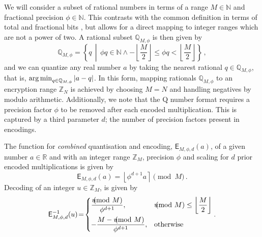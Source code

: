 \documentclass[10pt,letterpaper,oneside,twocolumn,journal]{IEEEtran}
\theoremstyle{definition}
\theoremstyle{definition}
\theoremstyle{remark}
\begin{document}
We will consider a subset of rational numbers in terms of a range $M \in \mathbb{N}$ and fractional precision $\phi \in \mathbb{N}$. This contrasts with the common definition in terms of total and fractional bits \cite{oberstarFixedPointRepresentationFractional2007,schulzedarupEncryptedCooperativeControl2019,farokhiSecurePrivateControl2017}, but allows for a direct mapping to integer ranges which are not a power of two. A rational subset $\mathbb{Q}_{M,\phi}$ is then given by
\begin{equation}
    \mathbb{Q}_{M,\phi} = \left\{q \,\middle|\, \phi q \in \mathbb{N} \wedge -\left\lfloor\frac{M}{2}\right\rfloor \leq \phi q < \left\lfloor\frac{M}{2}\right\rfloor \right\}\,,
\end{equation}
and we can quantize any real number $a$ by taking the nearest rational $q \in \mathbb{Q}_{M,\phi}$, that is, $\operatorname*{arg\,min}_{q\in\mathbb{Q}_{M,\phi}} |a-q|$. In this form, mapping rationals $\mathbb{Q}_{M,\phi}$ to an encryption range $\mathbb{Z}_N$ is achieved by choosing $M=N$ and handling negatives by modulo arithmetic. Additionally, we note that the Q number format requires a precision factor $\phi$ to be removed after each encoded multiplication. This is captured by a third parameter $d$; the number of precision factors present in encodings.

The function for \textit{combined} quantisation and encoding, $\mathsf{E}_{M,\phi,d}(a)$, of a given number $a \in \mathbb{R}$ and with an integer range $\mathbb{Z}_M$, precision $\phi$ and scaling for $d$ prior encoded multiplications is given by
\begin{equation}
    \mathsf{E}_{M,\phi,d}(a) = \left\lfloor \phi^{d+1} a \right\rceil \pmod{M}\,. \label{eqn:encode}
\end{equation}
Decoding of an integer $u \in \mathbb{Z}_M$, is given by
\begin{equation}
    \mathsf{E}^{-1}_{M,\phi,d}(u) \!=\! 
    \begin{dcases}
        \frac{u\hspace{-8pt}\pmod{M}}{\phi^{d+1}}, &u\hspace{-8pt}\pmod{M} \leq \left\lfloor\frac{M}{2}\right\rfloor \\
        -\frac{M - u\hspace{-8pt}\pmod{M}}{\phi^{d+1}}, &\text{otherwise} \\
    \end{dcases}.\label{eqn:decode}
\end{equation}
\end{document}
